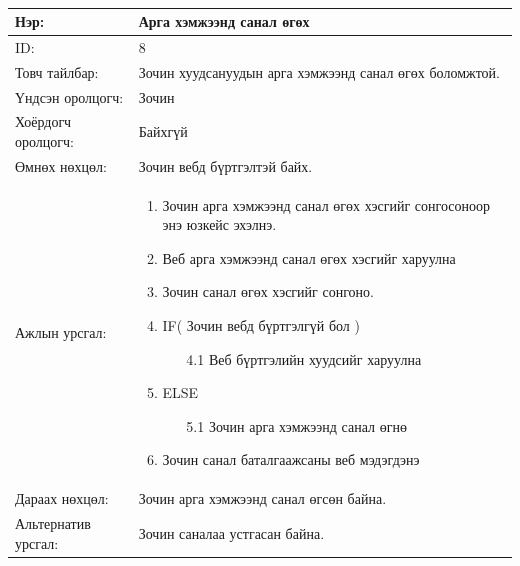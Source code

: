 \begin{center}
\begin{table}[!htbp]
	\caption{}
	\begin{tabular}{|p{4cm}|p{11cm}|}
		\hline
		Нэр: & Арга хэмжээнд санал өгөх  \\
		\hline
		ID: & 8 \\
		\hline
		Товч тайлбар: & Зочин хуудсануудын арга хэмжээнд санал өгөх боломжтой.  \\
		\hline
		Үндсэн оролцогч: & Зочин \\
		\hline
		Хоёрдогч оролцогч: & Байхгүй  \\
		\hline
		Өмнөх нөхцөл: &  Зочин вебд бүртгэлтэй байх. \\
		\hline
		Ажлын урсгал: & \begin{enumerate}
							\item Зочин арга хэмжээнд санал өгөх хэсгийг сонгосоноор энэ юзкейс эхэлнэ.
							\item Веб арга хэмжээнд санал өгөх хэсгийг харуулна
							\item Зочин санал өгөх хэсгийг сонгоно.
							\item IF( Зочин вебд бүртгэлгүй бол )
								\begin{enumerate}
									\item[4.1] Веб бүртгэлийн хуудсийг харуулна
								\end{enumerate}
							\item ELSE
								\begin{enumerate}
									\item[5.1] Зочин арга хэмжээнд санал өгнө
								\end{enumerate}
							\item Зочин санал баталгаажсаны веб мэдэгдэнэ
						\end{enumerate}	\\
		\hline
		Дараах нөхцөл: & Зочин арга хэмжээнд санал өгсөн байна. \\
		\hline
		Альтернатив урсгал: & Зочин саналаа устгасан байна. \\
		\hline
	\end{tabular}
\end{table}
\end{center}

